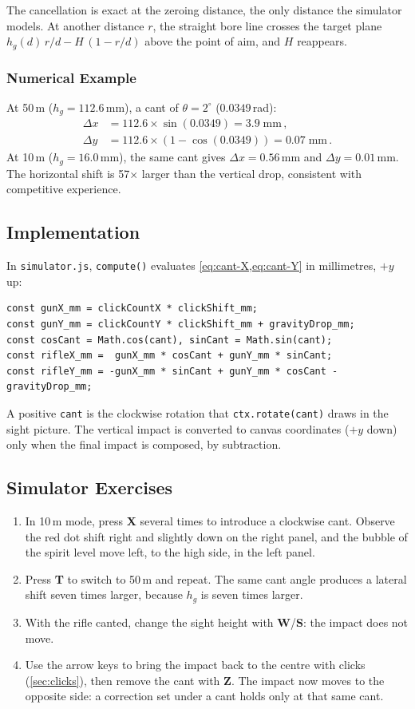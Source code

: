 \documentclass[11pt]{article}
\newcommand{\code}[1]{\texttt{#1}}
\newcommand{\file}[1]{\texttt{#1}}
\newcommand{\key}[1]{\textsf{\textbf{#1}}}
\begin{document}
The cancellation is exact at the zeroing distance, the only distance
the simulator models.  At another distance $r$, the straight bore line
crosses the target plane $h_g(d)\,r/d - H\,(1 - r/d)$ above the point
of aim, and $H$ reappears.

\subsubsection*{Numerical Example}
At 50\,m ($h_g = 112.6$\,mm), a cant of
$\theta = 2^\circ$ ($0.0349$\,rad):
\begin{align*}
  \Delta x &= 112.6 \times \sin(0.0349) = 3.9\;\text{mm}\,,\\
  \Delta y &= 112.6 \times (1 - \cos(0.0349)) = 0.07\;\text{mm}\,.
\end{align*}
At 10\,m ($h_g = 16.0$\,mm), the same cant gives $\Delta x = 0.56$\,mm
and $\Delta y = 0.01$\,mm.  The horizontal shift is 57$\times$ larger
than the vertical drop, consistent with competitive experience.

\subsection{Implementation}\label{sec:cant-impl}
In \file{simulator.js}, \code{compute()} evaluates
\cref{eq:cant-X,eq:cant-Y} in millimetres, $+y$ up:
\begin{lstlisting}
const gunX_mm = clickCountX * clickShift_mm;
const gunY_mm = clickCountY * clickShift_mm + gravityDrop_mm;
const cosCant = Math.cos(cant), sinCant = Math.sin(cant);
const rifleX_mm =  gunX_mm * cosCant + gunY_mm * sinCant;
const rifleY_mm = -gunX_mm * sinCant + gunY_mm * cosCant - gravityDrop_mm;
\end{lstlisting}
A positive \code{cant} is the clockwise rotation that
\code{ctx.rotate(cant)} draws in the sight picture.  The vertical
impact is converted to canvas coordinates ($+y$ down) only when the
final impact is composed, by subtraction.

\subsection{Simulator Exercises}
\begin{enumerate}[nosep]
  \item In 10\,m mode, press \key{X} several times to introduce a
        clockwise cant.  Observe the red dot shift right and slightly
        down on the right panel, and the bubble of the spirit level move
        left, to the high side, in the left panel.
  \item Press \key{T} to switch to 50\,m and repeat.  The same cant
        angle produces a lateral shift seven times larger, because
        $h_g$ is seven times larger.
  \item With the rifle canted, change the sight height with
        \key{W}/\key{S}: the impact does not move.
  \item Use the arrow keys to bring the impact back to the centre with
        clicks (\cref{sec:clicks}), then remove the cant with \key{Z}.
        The impact now moves to the opposite side: a correction set
        under a cant holds only at that same cant.
\end{enumerate}
\end{document}
